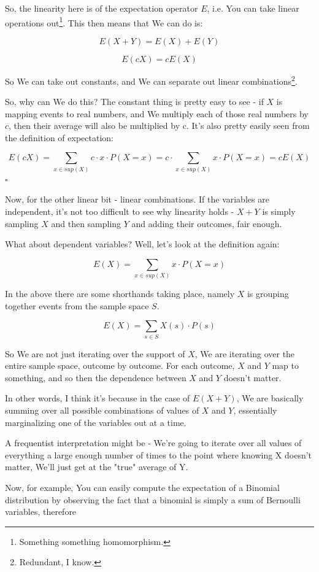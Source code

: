 \documentclass{article}
\newcommand{\qed}{\hfill$\square$}
\begin{document}
		So, the linearity here is of the expectation operator $E$, i.e. You can take linear operations out\footnote{Something something homomorphism.}. This then means that We can do is:
		
		$$E(X+Y) = E(X) + E(Y)$$
		
		$$E(cX) = cE(X)$$
		
		So We can take out constants, and We can separate out linear combinations\footnote{Redundant, I know.}.
		
		So, why can We do this? The constant thing is pretty easy to see - if $X$ is mapping events to real numbers, and We multiply each of those real numbers by $c$, then their average will also be multiplied by c. It's also pretty easily seen from the definition of expectation:
	
		$$E(cX) = \sum_{x \in sup(X)} c\cdot x\cdot P(X = x) = c\cdot \sum_{x \in sup(X)} x\cdot P(X = x) = cE(X)$$\qed
		
		Now, for the other linear bit - linear combinations. If the variables are independent, it's not too difficult to see why linearity holds - $X+Y$ is simply sampling $X$ and then sampling $Y$ and adding their outcomes, fair enough.
		
		What about dependent variables? Well, let's look at the definition again:
		
		$$E(X) = \sum_{x \in sup(X)} x\cdot P(X = x)$$
		
		In the above there are some shorthands taking place, namely $X$ is grouping together events from the sample space $S$.
		
		$$E(X) = \sum_{s \in S} X(s)\cdot P(s)$$
		
		So We are not just iterating over the support of $X$, We are iterating over the entire sample space, outcome by outcome. For each outcome, $X$ and $Y$ map to something, and so then the dependence between $X$ and $Y$ doesn't matter.
		
		In other words, I think it's because in the case of $E(X + Y)$, We are basically summing over all possible combinations of values of $X$ and $Y$, essentially marginalizing one of the variables out at a time. 
		
		A frequentist interpretation might be - We're going to iterate over all values of everything a large enough number of times to the point where knowing X doesn't matter, We'll just get at the "true" average of Y.
		
		Now, for example, You can easily compute the expectation of a Binomial distribution by observing the fact that a binomial is simply a sum of Bernoulli variables, therefore 
		
\end{document}
